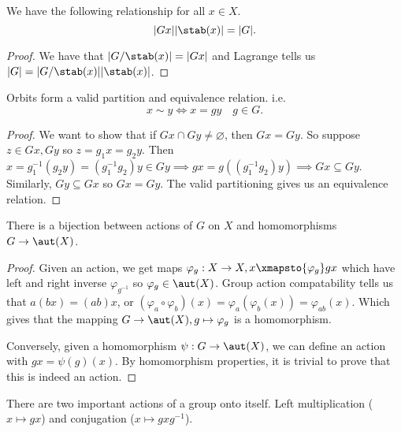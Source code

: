 \begin{cor}
\label{orbitstabilizer}
We have the following relationship for all $x \in X$.
\[ \lvert Gx \rvert \lvert \stab(x) \rvert = \lvert G \rvert. \]
\end{cor}

\begin{proof}
We have that $\lvert G / \stab(x) \rvert = \lvert Gx \rvert$ and
Lagrange tells us $\lvert G \rvert = \lvert G / \stab(x) \rvert \lvert
\stab(x) \rvert$.
\end{proof}

\begin{prop}
Orbits form a valid partition and equivalence relation. i.e.
\[ x \sim y \iff x = gy \quad g \in G. \]
\end{prop}

\begin{proof}
We want to show that if $Gx \cap Gy \neq \varnothing$, then $Gx = Gy$.
So suppose $z \in Gx, Gy$ so $z = g_1 x = g_2 y$. Then $x = g_1^{-1}(g_2
y) = (g_1^{-1} g_2) y \in Gy \implies gx = g((g_1^{-1}g_2)y) \implies Gx
\subseteq Gy$. Similarly, $Gy \subseteq Gx$ so $Gx = Gy$. The valid
partitioning gives us an equivalence relation.
\end{proof}

\begin{prop}
\label{actionbijection}
There is a bijection between actions of $G$ on $X$ and homomorphisms $G
\to \aut(X)$.
\end{prop}

\begin{proof}
Given an action, we get maps $\varphi_g : X \to X, x \xmapsto{\varphi_g}
gx$ which have left and right inverse $\varphi_{g^{-1}}$ so $\varphi_g
\in \aut(X)$. Group action compatability tells us that $a(bx) = (ab)x$,
or $(\varphi_a \circ \varphi_b)(x) = \varphi_a(\varphi_b(x)) =
\varphi_{ab}(x)$. Which gives that the mapping $G \to \aut(X), g \mapsto
\varphi_g$ is a homomorphism.

Conversely, given a homomorphism $\psi : G \to \aut(X)$, we can define
an action with $gx = \psi(g)(x)$. By homomorphism properties, it is
trivial to prove that this is indeed an action.
\end{proof}

\begin{rem}
There are two important actions of a group onto itself. Left
multiplication ($x \mapsto gx$) and conjugation ($x \mapsto gxg^{-1}$).
\end{rem}

